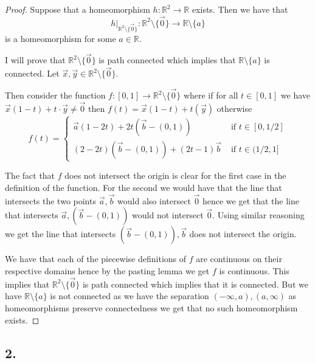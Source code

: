 \documentclass{amsart}
\theoremstyle{plain}
\theoremstyle{definition}
\theoremstyle{remark}
\begin{document}
\begin{proof}
    Suppose that a homeomorphism $h: \mathbb{R}^2\to \mathbb R$ exists. Then we have that $$h|_{\mathbb{R}^2\setminus \{\vec 0\}}:\mathbb{R}^2 \setminus \{\vec 0\}\to \mathbb R \setminus \{a\}$$ is a homeomorphism for some $a\in \mathbb R$. 
    
    I will prove that $\mathbb{R}^2\setminus \{\vec 0\}$ is path connected which implies that $\mathbb R \setminus \{a\}$ is  connected. Let $\vec{x},\vec{y}\in \mathbb{R}^2\setminus \{\vec{0}\}$. 
    
    Then consider the function $f:[0,1]\to \mathbb{R}^2\setminus \{\vec{0}\}$ where if for all $t\in [0,1]$ we have $\vec{x}(1-t)+t\cdot  \vec{y}\not = \vec 0$ then $f(t)=\vec{x}(1-t)+t(\vec{y})$ otherwise 
    \begin{equation}
        f(t)=\begin{cases}
            \vec{a}(1-2t)+2t (\vec{b}-(0,1)) & \text{ if } t\in [0,1/2]\\
            (2-2t)(\vec b - (0,1))+ (2t-1)\vec b & \text{ if } t \in (1/2,1]
        \end{cases}
    \end{equation}

    The fact that $f$ does not intersect the origin is clear for the first case in the definition of the function. For the second we would have that the line that intersects the two points $\vec{a},\vec{b}$ would also intersect $\vec{0}$ hence we get that the line that intersects $\vec{a},(\vec{b}-(0,1))$ would not intersect $\vec{0}$. Using similar reasoning we get the line that intersects $(\vec{b}-(0,1)),\vec{b}$ does not intersect the origin. 

    We have that each of the piecewise definitions of $f$ are continuous on their respective domains hence by  the pasting lemma we get $f$ is continuous. This implies that $\mathbb R^2 \setminus \{\vec 0\}$ is path connected which implies that it is connected. But we have $\mathbb{R}\setminus \{a\}$ is not connected as we have the separation  $(-\infty,a),(a,\infty)$ as homeomorphisms preserve connectedness we get that no such homeomorphism exists.





\end{proof}



\vspace{.15in}
\noindent
\subsection*{2.} 
\end{document}
